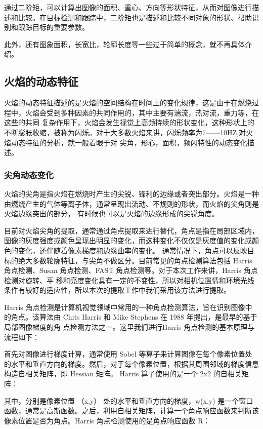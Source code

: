 通过二阶矩，可以计算出图像的面积、重心、方向等形状特征，从而对图像进行描述和比较。在目标检测和跟踪中，二阶矩也是描述和比较不同对象的形状、帮助识别和跟踪目标的重要参数。

此外，还有图象面积，长宽比，轮廓长度等一些过于简单的概念，就不再具体介绍。

\subsection{火焰的动态特征}
火焰的动态特征描述的是火焰的空间结构在时间上的变化规律，这是由于在燃烧过程中，火焰会受到多种因素的共同作用的，其中主要有湍流，热对流，重力等，在这些的共同
复杂作用下，火焰会发生视觉上高频持续的形状变化，这种形状上的不断膨胀收缩，被称为闪烁。对于大多数火焰来讲，闪烁频率为7——10HZ,对火焰动态特征的分析，就一般着眼于对
尖角，形心，面积，频闪特性的动态变化描述。
\subsubsection{尖角动态变化}
火焰的尖角是指火焰在燃烧时产生的尖锐、锋利的边缘或者突出部分。火焰是一种由燃烧产生的气体等离子体，通常呈现出流动、不规则的形状，而火焰的尖角则是火焰边缘突出的部分，
有时候也可以是火焰的边缘形成的尖锐角度。

目前对火焰尖角的提取，通常通过角点提取来进行替代，角点是指在局部区域内，图像的灰度强度或颜色呈现出明显的变化，而这种变化不仅仅是灰度值的变化或颜色的变化，还伴随着像素梯度和边缘曲率的变化。
通常情况下，角点可以反映目标的绝大多数轮廓特征，与尖角不做区分。目前常见的角点检测算法包括 Harris 角点检测、Susan 角点检测、FAST 角点检测等。对于本次工作来讲，Harris 角点检测对旋转、平
移和亮度变化具有一定的不变性，所以对相机位置情和环境光线条件有较好的适应性，所以本次的提取工作中我们采用该方法进行提取。

Harris 角点检测是计算机视觉领域中常用的一种角点检测算法，旨在识别图像中的角点。该算法由 Chris Harris 和 Mike Stephens 在 1988 年提出\cite{harris1988combined}，是最早的基于局部图像梯度的角
点检测方法之一。这里我们进行Harris 角点检测的基本原理与流程如下：

首先对图像进行梯度计算，通常使用 Sobel 等算子来计算图像在每个像素位置处的水平和垂直方向的梯度。然后，对于每个像素位置，根据其周围邻域的梯度信息构造自相关矩阵，即 Hessian 矩阵。
Harris 算子使用的是一个 2x2 的自相关矩阵：

其中，分别是像素位置 （x,y） 处的水平和垂直方向的梯度，w(x,y) 是一个窗口函数，通常是高斯函数。之后，利用自相关矩阵，计算一个角点响应函数来判断该像素位置是否为角点。Harris 角点检测使用的是角点响应函数 
R：


